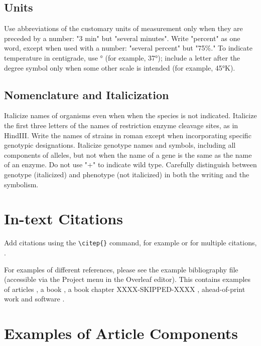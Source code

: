 \documentclass[9pt,twocolumn,twoside]{g3_article/gsag3jnl}
\begin{document}
    \subsection*{Units} Use abbreviations of the customary units of measurement only when they are preceded by a number: 
            "3 min" but "several minutes". Write "percent" as one word, except when used with a number: 
            "several percent" but "75\%." To indicate temperature in centigrade, use ° 
            (for example, 37°); include a letter after the degree symbol only when some 
            other scale is intended (for example, 45°K).

    \subsection*{Nomenclature and Italicization} Italicize names of organisms even when  when the species is 
        not indicated.  Italicize the first three letters of the names of restriction enzyme cleavage 
        sites, as in HindIII. Write the names of strains in roman except when incorporating 
        specific genotypic designations. Italicize genotype names and symbols, including all components 
        of alleles, but not when the name of a gene is the same as the name of 
        an enzyme. Do not use "+" to indicate wild type. Carefully distinguish between genotype 
        (italicized) and phenotype (not italicized) in both the writing and the symbolism.

\section*{In-text Citations}

Add citations using the \verb|\citep{}| command, for example \citep{neher2013genealogies} or for multiple citations, \citep{neher2013genealogies, rodelsperger2014characterization}.

For examples of different references, please see the example bibliography file 
(accessible via the Project menu in the Overleaf editor). This contains examples 
of articles \citep{neher2013genealogies, rodelsperger2014characterization}, a 
book \citep{Sturtevent2001}, a book 
chapter 
XXXX-SKIPPED-XXXX
, ahead-of-print work \citep{Starita2015} and software \citep{Kruijer2015}.

\section*{Examples of Article Components}
\label{sec:examples}
\end{document}
